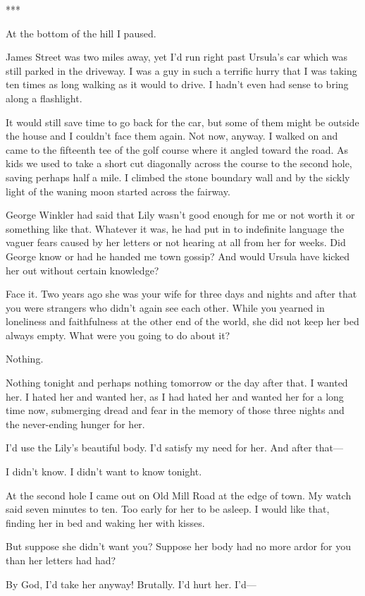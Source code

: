 \documentclass{novel}
\begin{document}
{***

At the bottom of the hill I paused.

James Street was two miles away, yet I’d run right past Ursula’s car which was still parked in the driveway. I was a guy in such a terrific hurry that I was taking ten times as long walking as it would to drive. I hadn’t even had sense to bring along a flashlight.

It would still save time to go back for the car, but some of them might be outside the house and I couldn’t face them again. Not now, anyway. I walked on and came to the fifteenth tee of the golf course where it angled toward the road. As kids we used to take a short cut diagonally across the course to the second hole, saving perhaps half a mile. I climbed the stone boundary wall and by the sickly light of the waning moon started across the fairway.

George Winkler had said that Lily wasn’t good enough for me or not worth it or something like that. Whatever it was, he had put in to indefinite language the vaguer fears caused by her letters or not hearing at all from her for weeks. Did George know or had he handed me town gossip? And would Ursula have kicked her out without certain knowledge?

Face it. Two years ago she was your wife for three days and nights and after that you were strangers who didn’t again see each other. While you yearned in loneliness and faithfulness at the other end of the world, she did not keep her bed always empty. What were you going to do about it?

Nothing.

Nothing tonight and perhaps nothing tomorrow or the day after that. I wanted her. I hated her and wanted her, as I had hated her and wanted her for a long time now, submerging dread and fear in the memory of those three nights and the never-ending hunger for her.

I’d use the Lily’s beautiful body. I’d satisfy my need for her. And after that—

I didn’t know. I didn’t want to know tonight.

At the second hole I came out on Old Mill Road at the edge of town. My watch said seven minutes to ten. Too early for her to be asleep. I would like that, finding her in bed and waking her with kisses.

But suppose she didn’t want you? Suppose her body had no more ardor for you than her letters had had?

By God, I’d take her anyway! Brutally. I’d hurt her. I’d—

}
\end{document}
